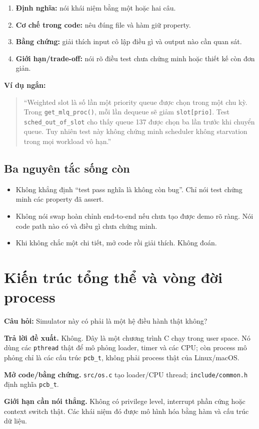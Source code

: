 \documentclass[11pt,a4paper]{article}
\newcommand{\code}[1]{\texttt{\color{navy}#1}}
\newcommand{\q}[1]{%
  \vspace{0.55em}\noindent
  \colorbox{pale}{\parbox{\dimexpr\textwidth-2\fboxsep}{\textbf{\color{navy}Câu hỏi:} #1}}%
  \par\vspace{0.3em}}
\newcommand{\ans}[1]{\textbf{\color{cyan}Trả lời đề xuất.} #1\par}
\newcommand{\proofcode}[1]{\textbf{\color{orange}Mở code/bằng chứng.} #1\par}
\newcommand{\limitanswer}[1]{\textbf{\color{red}Giới hạn cần nói thẳng.} #1\par}
\begin{document}
\begin{enumerate}
  \item \textbf{Định nghĩa:} nói khái niệm bằng một hoặc hai câu.
  \item \textbf{Cơ chế trong code:} nêu đúng file và hàm giữ property.
  \item \textbf{Bằng chứng:} giải thích input cô lập điều gì và output nào cần quan sát.
  \item \textbf{Giới hạn/trade-off:} nói rõ điều test chưa chứng minh hoặc thiết kế còn đơn giản.
\end{enumerate}

\textbf{Ví dụ ngắn:}

\begin{quote}
``Weighted slot là số lần một priority queue được chọn trong một chu kỳ.
Trong \code{get\_mlq\_proc()}, mỗi lần dequeue sẽ giảm \code{slot[prio]}.
Test \code{sched\_out\_of\_slot} cho thấy queue 137 được chọn ba lần trước khi
chuyển queue. Tuy nhiên test này không chứng minh scheduler không starvation
trong mọi workload vô hạn.''
\end{quote}

\subsection{Ba nguyên tắc sống còn}

\begin{itemize}
  \item Không khẳng định ``test pass nghĩa là không còn bug''. Chỉ nói test chứng minh các property đã assert.
  \item Không nói swap hoàn chỉnh end-to-end nếu chưa tạo được demo rõ ràng. Nói code path nào có và điều gì chưa chứng minh.
  \item Khi không chắc một chi tiết, mở code rồi giải thích. Không đoán.
\end{itemize}

\section{Kiến trúc tổng thể và vòng đời process}

\q{Simulator này có phải là một hệ điều hành thật không?}
\ans{Không. Đây là một chương trình C chạy trong user space. Nó dùng các
\code{pthread} thật để mô phỏng loader, timer và các CPU; còn process mô phỏng
chỉ là các cấu trúc \code{pcb\_t}, không phải process thật của Linux/macOS.}
\proofcode{\code{src/os.c} tạo loader/CPU thread; \code{include/common.h} định
nghĩa \code{pcb\_t}.}
\limitanswer{Không có privilege level, interrupt phần cứng hoặc context switch
thật. Các khái niệm đó được mô hình hóa bằng hàm và cấu trúc dữ liệu.}
\end{document}
